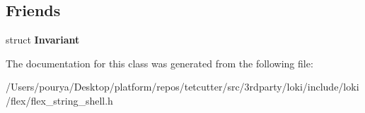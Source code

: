 \subsection*{Friends}
\begin{DoxyCompactItemize}
\item 
\hypertarget{classflex__string_afae2d776dbbbd9036eb95c8b01d8399e}{}struct {\bfseries Invariant}\label{classflex__string_afae2d776dbbbd9036eb95c8b01d8399e}

\end{DoxyCompactItemize}


The documentation for this class was generated from the following file\+:\begin{DoxyCompactItemize}
\item 
/\+Users/pourya/\+Desktop/platform/repos/tetcutter/src/3rdparty/loki/include/loki/flex/flex\+\_\+string\+\_\+shell.\+h\end{DoxyCompactItemize}
